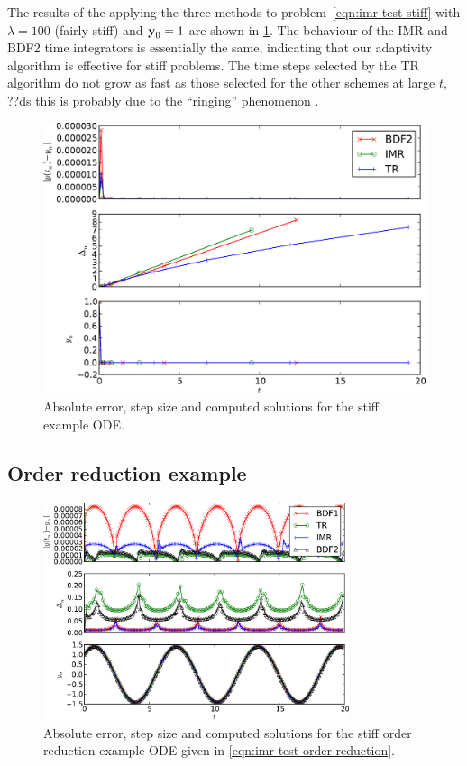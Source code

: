 The results of the applying the three methods to problem~\cref{eqn:imr-test-stiff} with $\lambda = 100$ (fairly stiff) and $\boldsymbol{\mathrm{y}}_0 = 1$ are shown in \cref{fig:imr-stiff-example}.
The behaviour of the IMR and BDF2 time integrators is essentially the same, indicating that our adaptivity algorithm is effective for stiff problems.
The time steps selected by the TR algorithm do not grow as fast as those selected for the other schemes at large $t$, ??ds this is probably due to the ``ringing'' phenomenon \cite{??ds}.

\begin{figure}
  \centering
  \includegraphics[width=1\textwidth]{plots/aimr_odes_traces/simple_stiff-errornormsvs-dtsvs-tracevaluesvstimes}
  \caption{Absolute error, step size and computed solutions for the stiff example ODE.}
  \label{fig:imr-stiff-example}
\end{figure}


\subsection{Order reduction example}
\label{sec:order-reduct-example}

\begin{figure}
  \centering  \includegraphics[width=0.8\textwidth]{plots/aimr_odes_traces/strong_order_reduction-errornormsvs-dtsvs-tracevaluesvstimes}
  \caption{Absolute error, step size and computed solutions for the stiff order reduction example ODE given in \cref{eqn:imr-test-order-reduction}.}
  \label{fig:imr-order-reduction-example}
\end{figure}

